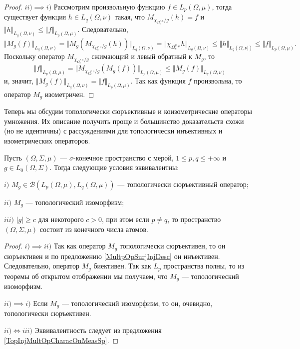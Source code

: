 \begin{proof}
$ii)$$\implies$$ i)$ Рассмотрим произвольную функцию $f\in L_p(\Omega,\mu)$, тогда существует функция $h\in L_q(\Omega,\nu)$ такая, что $M_{\chi_{\Omega_c^{\nu,\mu}}/g}(h)=f$ и $\Vert h\Vert_{L_q(\Omega,\nu)}\leq \Vert f\Vert_{L_p(\Omega,\mu)}$. Следовательно,
$$
\Vert M_g(f)\Vert_{L_q(\Omega,\nu)}
=\Vert M_g(M_{\chi_{\Omega_c^{\nu,\mu}}/g}(h))\Vert_{L_q(\Omega,\nu)}
=\Vert \chi_{\Omega_c^{\nu,\mu}}h\Vert_{L_q(\Omega,\nu)}
\leq\Vert h\Vert_{L_q(\Omega,\nu|)}
\leq\Vert f\Vert_{L_p(\Omega,\mu)}.
$$
Поскольку оператор $M_{\chi_{\Omega_c^{\nu,\mu}}/g}$ сжимающий и левый обратный к $M_g$, то
$$
\Vert f\Vert_{L_p(\Omega,\mu)}
=\Vert M_{\chi_{\Omega_c^{\nu,\mu}}/g}(M_g(f))\Vert_{L_p(\Omega,\mu)}
\leq\Vert M_g(f)\Vert_{L_q(\Omega,\nu)}
$$
и, значит, $\Vert M_g(f)\Vert_{L_q(\Omega,\nu)}=\Vert f\Vert_{L_p(\Omega,\mu)}$. Так как функция $f$ произвольна, то оператор $M_g$ изометричен.
\end{proof}

Теперь мы обсудим топологически сюръективные и коизометрические операторы умножения. Их описание получить проще и большинство доказательств схожи (но не идентичны) с рассуждениями для топологически инъективных и изометрических операторов.

\begin{proposition}\label{TopSurMultOpCharacOnMeasSp} Пусть $(\Omega,\Sigma,\mu)$ --- $\sigma$-конечное пространство с мерой, $1\leq p,q\leq +\infty$ и $g\in L_0(\Omega,\Sigma)$. Тогда следующие условия эквивалентны:

$i)$ $M_g\in\mathcal{B}(L_p(\Omega,\mu),L_q(\Omega,\mu))$ --- топологически сюръективный оператор;

$ii)$ $M_g$ --- топологический изоморфизм;

$iii)$ $|g|\geq c$ для некоторого $c>0$, при этом если $p\neq q$, то пространство $(\Omega,\Sigma,\mu)$ состоит из конечного числа атомов.
\end{proposition}
\begin{proof} $i)$$\implies$$ ii)$ Так как оператор $M_g$ топологически сюръективен, то он сюръективен и по предложению \ref{MultpOpSurjInjDesc} он инъективен. Следовательно, оператор $M_g$ биективен. Так как $L_p$ пространства полны, то из теоремы об открытом отображении мы получаем, что $M_g$ --- топологический изоморфизм. 

$ii)$$\implies$$ i)$ Если $M_g$ --- топологический изоморфизм, то он, очевидно, топологически сюръективен.

$ii)\Longleftrightarrow iii)$ Эквивалентность следует из предложения \ref{TopInjMultOpCharacOnMeasSp}.
\end{proof}
 
